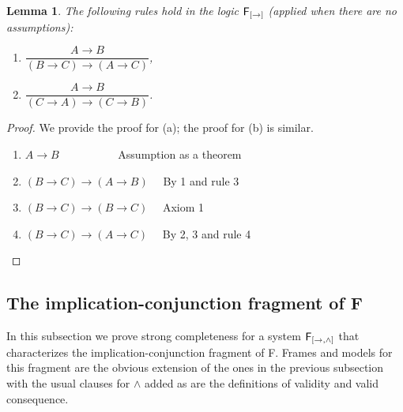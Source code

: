 \documentclass[12pt]{article}
\newtheorem{lem}[thm]{Lemma}
\newtheorem{dfn}[thm]{Definition}
\begin{document}
\begin{lem}\label{4}
The following rules hold in the logic $ {\sf F_{[\rightarrow]}}  $ (applied when there are no assumptions):
\begin{enumerate}
\item[(a)]$  \dfrac{A\rightarrow B}{(B\rightarrow C)\rightarrow (A\rightarrow C)}$,
\item[(b)]$ \dfrac{A\rightarrow B}{(C\rightarrow A)\rightarrow (C\rightarrow B)}$.
\end{enumerate}
\end{lem}
\begin{proof} We provide the proof for (a); the proof for (b) is similar.
\begin{enumerate}
\item $A\rightarrow B  $ ~~~~~~~~~~Assumption as a theorem
\item $ (B\rightarrow C)\rightarrow (A\rightarrow B ) $ ~~By 1 and rule 3
\item $  (B\rightarrow C)\rightarrow (B\rightarrow C)$ ~~Axiom 1

\item $ (B\rightarrow C)\rightarrow (A\rightarrow C) $ ~~By 2, 3 and rule 4
\end{enumerate}
\end{proof}


\subsection{The implication-conjunction fragment of {\sf F}}
In this subsection we prove strong completeness for a system $ {\sf F_{[\rightarrow, \wedge]}}  $ that characterizes the implication-conjunction fragment of {\sf F}. Frames and models for this fragment are the obvious extension of the ones in the previous subsection with the usual clauses for $\wedge$ added as are the definitions of validity and valid consequence.
\end{document}
